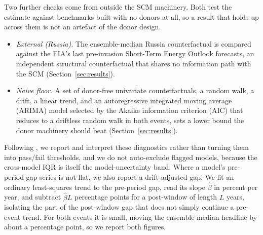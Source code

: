 Two further checks come from outside the SCM machinery. Both test the estimate against
benchmarks built with no donors at all, so a result that holds up across them is not an
artefact of the donor design.
\begin{itemize}
\item \textit{External (Russia).} The ensemble-median Russia counterfactual is compared
against the EIA's last pre-invasion Short-Term Energy Outlook forecasts, an independent
structural counterfactual that shares no information path with the SCM
(Section~\ref{sec:results}).
\item \textit{Naive floor.} A set of donor-free univariate counterfactuals, a random walk, a
drift, a linear trend, and an autoregressive integrated moving average (ARIMA) model selected
by the Akaike information criterion (AIC) that reduces to a driftless random walk in both
events, sets a lower bound the donor machinery should beat (Section~\ref{sec:results}).
\end{itemize}

Following \citet{roth2022,rambachanroth2023}, we report and interpret these diagnostics
rather than turning them into pass/fail thresholds, and we do not auto-exclude flagged
models, because the cross-model IQR is itself the model-uncertainty band. Where a model's
pre-period gap series is not flat, we also report a drift-adjusted gap. We fit an ordinary
least-squares trend to the pre-period gap, read its slope $\hat\beta$ in percent per year,
and subtract $\hat\beta L$ percentage points for a post-window of length $L$ years,
isolating the part of the post-window gap that does not simply continue a pre-event trend.
For both events it is small, moving the ensemble-median headline by about a percentage
point, so we report both figures.



